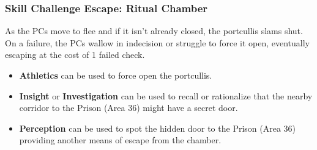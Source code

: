 \subsubsection*{Skill Challenge Escape: Ritual Chamber}
\label{sec:SC_RitualChamber}
As the PCs move to flee and if it isn't already closed, the portcullis slams shut. On a failure, the PCs
wallow in indecision or struggle to force it open, eventually escaping at the cost of 1 failed check.
\begin{skillChallenge}
  \begin{itemize}
    \item \textbf{Athletics} can be used to force open the portcullis. \moderateDC
    \item \textbf{Insight} or \textbf{Investigation} can be used to recall or rationalize that the nearby
    corridor to the Prison (Area 36) might have a secret door. \hardDC
    \item \textbf{Perception} can be used to spot the hidden door to the Prison (Area 36) providing another
    means of escape from the chamber. \moderateDC
  \end{itemize}
\end{skillChallenge}
